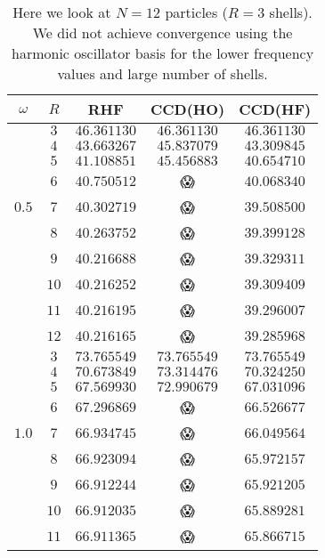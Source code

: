 \documentclass[
    a4paper, aps, twocolumn, floatfix, superscriptaddress,
    nofootinbib]{revtex4-1}
\newcommand{\nan}{\DejaSans 😱}
\newcommand{\1}{\mathds{1}}
\begin{document}
    \begin{table}
        \centering
        \caption{Here we look at $N = 12$ particles ($R = 3$ shells).  We did
        not achieve convergence using the harmonic oscillator basis for the
        lower frequency values and large number of shells.}
        \begin{ruledtabular}
            \begin{tabular}{c|c|ccc}
                $\omega$ & $R$ & RHF & CCD(HO) & CCD(HF) \\
                \hline
                      & $3$ & $46.361130$ & $46.361130$ & $46.361130$ \\
                      & $4$ & $43.663267$ & $45.837079$ & $43.309845$ \\
                      & $5$ & $41.108851$ & $45.456883$ & $40.654710$ \\
                      & $6$ & $40.750512$ & \nan & $40.068340$ \\
                $0.5$ & $7$ & $40.302719$ & \nan & $39.508500$ \\
                      & $8$ & $40.263752$ & \nan & $39.399128$ \\
                      & $9$ & $40.216688$ & \nan & $39.329311$ \\
                      & $10$ & $40.216252$ & \nan & $39.309409$ \\
                      & $11$ & $40.216195$ & \nan & $39.296007$ \\
                      & $12$ & $40.216165$ & \nan & $39.285968$ \\
                \hline
                      & $3$ & $73.765549$ & $73.765549$ & $73.765549$ \\
                      & $4$ & $70.673849$ & $73.314476$ & $70.324250$ \\
                      & $5$ & $67.569930$ & $72.990679$ & $67.031096$ \\
                      & $6$ & $67.296869$ & \nan & $66.526677$ \\
                $1.0$ & $7$ & $66.934745$ & \nan & $66.049564$ \\
                      & $8$ & $66.923094$ & \nan & $65.972157$ \\
                      & $9$ & $66.912244$ & \nan & $65.921205$ \\
                      & $10$ & $66.912035$ & \nan & $65.889281$ \\
                      & $11$ & $66.911365$ & \nan & $65.866715$ \\

\end{tabular}
\end{ruledtabular}
\end{table}
\end{document}
